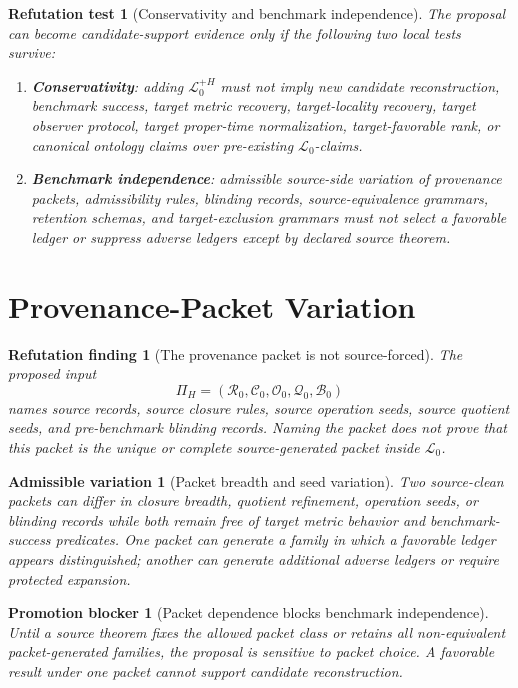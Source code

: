 \documentclass[11pt]{article}
\newcommand{\Lang}{\mathcal{L}_{0}}
\newcommand{\LangPlus}{\mathcal{L}_{0}^{+H}}
\newtheorem{test}{Refutation test}
\newtheorem{finding}{Refutation finding}
\newtheorem{variation}{Admissible variation}
\newtheorem{blocker}{Promotion blocker}
\begin{document}
\begin{test}[Conservativity and benchmark independence]
The proposal can become candidate-support evidence only if the following
two local tests survive:
\begin{enumerate}
    \item \textbf{Conservativity}: adding \(\LangPlus\) must not imply new
    candidate reconstruction, benchmark success, target metric recovery,
    target-locality recovery, target observer protocol, target proper-time
    normalization, target-favorable rank, or canonical ontology claims over
    pre-existing \(\Lang\)-claims.
    \item \textbf{Benchmark independence}: admissible source-side variation
    of provenance packets, admissibility rules, blinding records,
    source-equivalence grammars, retention schemas, and target-exclusion
    grammars must not select a favorable ledger or suppress adverse ledgers
    except by declared source theorem.
\end{enumerate}
\end{test}

\section{Provenance-Packet Variation}

\begin{finding}[The provenance packet is not source-forced]
The proposed input
\[
\Pi_H=(\mathcal{R}_{0},\mathcal{C}_{0},\mathcal{O}_{0},
\mathcal{Q}_{0},\mathcal{B}_{0})
\]
names source records, source closure rules, source operation seeds, source
quotient seeds, and pre-benchmark blinding records. Naming the packet does
not prove that this packet is the unique or complete source-generated packet
inside \(\Lang\).
\end{finding}

\begin{variation}[Packet breadth and seed variation]
Two source-clean packets can differ in closure breadth, quotient refinement,
operation seeds, or blinding records while both remain free of target metric
behavior and benchmark-success predicates. One packet can generate a
family in which a favorable ledger appears distinguished; another can
generate additional adverse ledgers or require protected expansion.
\end{variation}

\begin{blocker}[Packet dependence blocks benchmark independence]
Until a source theorem fixes the allowed packet class or retains all
non-equivalent packet-generated families, the proposal is sensitive to
packet choice. A favorable result under one packet cannot support
candidate reconstruction.
\end{blocker}
\end{document}
